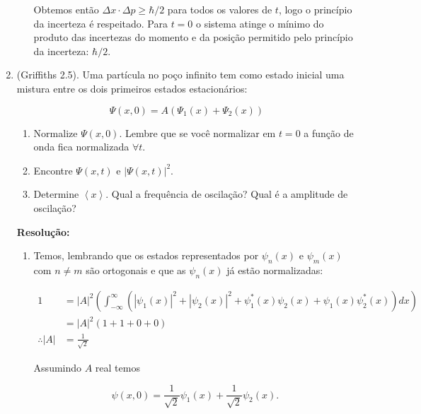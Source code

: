 \documentclass[a4paper, 12pt, notitlepage]{article}
\begin{document}
\begin{enumerate}
\begin{enumerate}
  Obtemos então $\Delta x \cdot \Delta p \ge \hbar/2$ para todos os valores de $t$, logo o princípio da incerteza é respeitado. Para $t = 0$ o sistema atinge o mínimo do produto das incertezas do momento e da posição permitido pelo princípio da incerteza: $\hbar/2$.

\end{enumerate}

\item (Griffiths 2.5).\newline
  Uma partícula no poço infinito tem como estado inicial uma mistura entre os dois primeiros estados estacionários:
  
  \begin{equation*}
  \Psi(x,0) = A\left(\Psi_1(x) + \Psi_2(x)\right)
  \end{equation*}
  
  \begin{enumerate}
    \item Normalize $\Psi(x,0)$. Lembre que se você normalizar em $t=0$ a função de onda fica normalizada $\forall t$.
    \item Encontre $\Psi(x,t)$ e $|\Psi(x,t)|^2$.
    \item Determine $\left\langle x \right\rangle$. Qual a frequência de oscilação? Qual é a amplitude de oscilação?
  \end{enumerate}
  
  \textbf{Resolução: }
  \begin{enumerate}
  \item Temos, lembrando que os estados representados por $\psi_n(x)$ e $\psi_m(x)$ com $n \neq m$ são ortogonais e que as $\psi_n(x)$ já estão normalizadas:
  
  \begin{align*}
  1 &= |A|^2 \left(\int_{-\infty}^{\infty} \left( |\psi_1(x)|^2 + |\psi_2(x)|^2 + \psi_1^{\ast}(x) \psi_2(x) + \psi_1(x) \psi_2^{\ast} (x) \right) dx \right) \\
  &= |A|^2  \left(1 + 1 + 0 + 0\right) \\
  \therefore |A| &= \frac{1}{\sqrt{2}}
  \end{align*}
  
  Assumindo $A$ real temos
  
  \begin{equation*}
  \psi(x, 0) = \frac{1}{\sqrt{2}} \psi_1(x) + \frac{1}{\sqrt{2}} \psi_2(x).
  \end{equation*}
  

\end{enumerate}
\end{enumerate}
\end{document}
